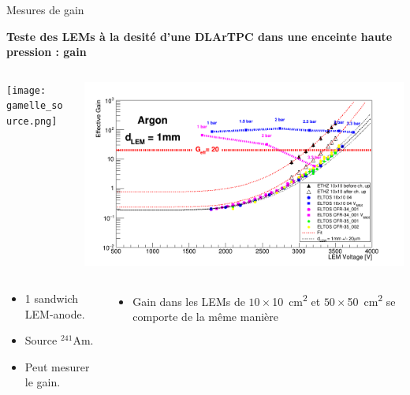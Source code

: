     \begin{frame}{Mesures de gain}
    	\begin{scriptsize}
    		\begin{center}\textbf{Teste des LEMs à la desité d'une DLArTPC dans une enceinte haute pression : gain}\\\end{center}
    		\begin{columns}
    			\begin{column}{0.46\textwidth}
    				\centering \texttt{[image: gamelle\_source.png]}
    			\end{column}\hfill
    			\begin{column}{0.58\textwidth}
    				\centering \includegraphics[width=\textwidth]{./pictures/gain.png}
    			\end{column}
    		\end{columns}\vfill
    		\begin{columns}
    			\begin{column}{0.38\textwidth}
    				\begin{itemize}
    					\item 1 sandwich LEM-anode.
    					\item Source $^{241}$Am.
    					\item Peut mesurer le gain.
    				\end{itemize}
    			\end{column}\hfill
    			\begin{column}{0.58\textwidth}
    				\begin{itemize}
    					\item Gain dans les LEMs de $10\times$\SI{10}{\centi\meter\squared} et $50\times$\SI{50}{\centi\meter\squared} se comporte de la même manière
    				\end{itemize}
    			\end{column}
    		\end{columns}
    	\end{scriptsize}
    \end{frame}

